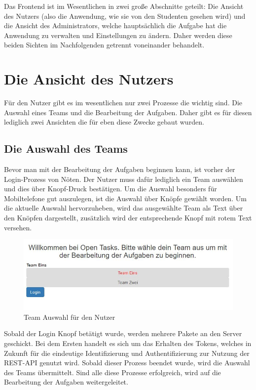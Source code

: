 Das Frontend ist im Wesentlichen in zwei große Abschnitte geteilt: Die Ansicht des Nutzers (also die Anwendung, wie sie von den Studenten gesehen wird) und die Ansicht des Administrators, welche hauptsächlich die Aufgabe hat die Anwendung zu verwalten und Einstellungen zu ändern. Daher werden diese beiden Sichten im Nachfolgenden getrennt voneinander behandelt.

\section{Die Ansicht des Nutzers}

Für den Nutzer gibt es im wesentlichen nur zwei Prozesse die wichtig sind. Die Auswahl eines Teams und die Bearbeitung der Aufgaben. Daher gibt es für diesen lediglich zwei Ansichten die für eben diese Zwecke gebaut wurden.

\subsection{Die Auswahl des Teams}

Bevor man mit der Bearbeitung der Aufgaben beginnen kann, ist vorher der Login-Prozess von Nöten. Der Nutzer muss dafür lediglich ein Team auswählen und dies über Knopf-Druck bestätigen. Um die Auswahl besonders für Mobiltelefone gut auszulegen, ist die Auswahl über Knöpfe gewählt worden. Um die aktuelle Auswahl hervorzuheben, wird das ausgewählte Team als Text über den Knöpfen dargestellt, zusätzlich wird der entsprechende Knopf mit rotem Text versehen.
\begin{figure}[htp]     %
\centering
\includegraphics[width=1\textwidth]{bilder/UserLogin} 
\caption[Login für den Nutzer / Teamauswahl]{Team Auswahl für den Nutzer}
\end{figure} 

Sobald der Login Knopf betätigt wurde, werden mehrere Pakete an den Server geschickt. Bei dem Ersten handelt es sich um das Erhalten des Tokens, welches in Zukunft für die eindeutige Identifizierung und Authentifizierung zur Nutzung der REST-API genutzt wird. Sobald dieser Prozess beendet wurde, wird die Auswahl des Teams übermittelt. Sind alle diese Prozesse erfolgreich, wird auf die Bearbeitung der Aufgaben weitergeleitet. 

